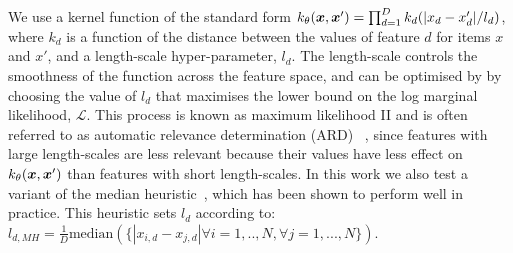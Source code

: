 We use a kernel function of the standard form 
$k_{\theta}(\boldsymbol x, \boldsymbol x') = \prod_{d=1}^D k_d(|x_d - x_d'| / l_d)$, 
where $k_d$ is a function of the distance between the values of feature $d$ 
for items $x$ and $x'$, and a length-scale hyper-parameter, $l_d$.
The length-scale controls the smoothness of the function across the feature space,
and can be optimised by 
by choosing the value of $l_d$ that maximises the lower bound on 
the log marginal likelihood, $\mathcal{L}$.
This process is known as maximum likelihood II and is often referred to as automatic relevance determination (ARD)
~\cite{rasmussen_gaussian_2006}, since features with large length-scales are less relevant because their values
have less effect on $k_{\theta}(\boldsymbol x, \boldsymbol x') $ than features with short length-scales.
In this work we also test a variant of the median heuristic~\cite{gretton2012optimal},
which has been shown to perform well in practice. 
This heuristic sets $l_d$ according to: 
$ l_{d,MH} = \frac{1}{D} \mathrm{median}( \{ |x_{i,d} - x_{j,d}| \forall i=1,..,N, \forall j=1,...,N\} ) $.

